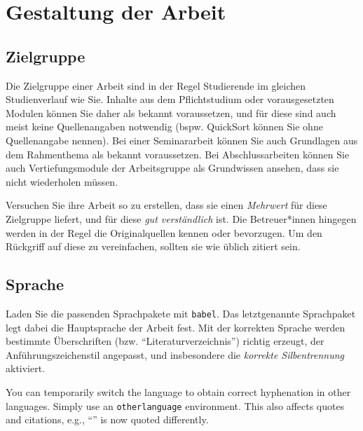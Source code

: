 \chapter{Gestaltung der Arbeit}
\section{Zielgruppe}

Die Zielgruppe einer Arbeit sind in der Regel Studierende im gleichen Studienverlauf wie Sie.
Inhalte aus dem Pflichtstudium oder vorausgesetzten Modulen können Sie daher
als bekannt voraussetzen, und für diese sind auch meist keine Quellenangaben
notwendig (bspw.{} QuickSort können Sie ohne Quellenangabe nennen).
Bei einer Seminararbeit können Sie auch Grundlagen aus dem Rahmenthema als bekannt voraussetzen.
Bei Abschlussarbeiten können Sie auch Vertiefungsmodule der Arbeitsgruppe als Grundwissen ansehen,
dass sie nicht wiederholen müssen.

Versuchen Sie ihre Arbeit so zu erstellen, dass sie einen \emph{Mehrwert} für diese Zielgruppe
liefert, und für diese \emph{gut verständlich} ist. Die Betreuer*innen hingegen werden in der Regel die
Originalquellen kennen oder bevorzugen. Um den Rückgriff auf diese zu vereinfachen, sollten
sie wie üblich zitiert sein.

\section{Sprache}
Laden Sie die passenden Sprachpakete mit \texttt{babel}. Das letztgenannte Sprachpaket legt dabei die Hauptsprache der Arbeit fest.
Mit der korrekten Sprache werden bestimmte Überschriften (bzw.{} \enquote{Literaturverzeichnis}) richtig erzeugt,
der Anführungszeichenstil angepasst, und insbesondere die \emph{korrekte Silbentrennung} aktiviert.

\begin{otherlanguage}{english}
You can temporarily switch the language to obtain correct hyphenation in other
languages. Simply use an \texttt{otherlanguage} environment.
This also affects quotes and citations, e.g., \enquote{\textcite{Deininger2017}} is now quoted differently.
\end{otherlanguage}


